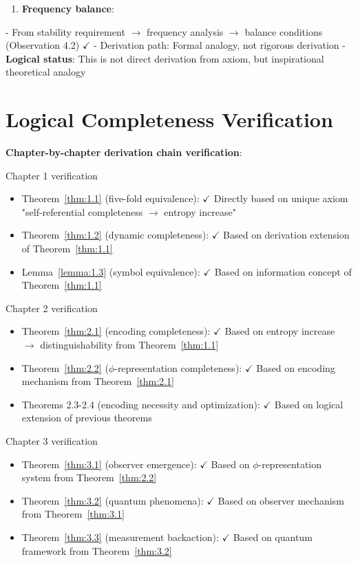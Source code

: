 \begin{enumerate}
\item \textbf{Frequency balance}:
\end{enumerate}
   - From stability requirement $\rightarrow$ frequency analysis $\rightarrow$ balance conditions (Observation 4.2) $\checkmark$
   - Derivation path: Formal analogy, not rigorous derivation
   - \textbf{Logical status}: This is not direct derivation from axiom, but inspirational theoretical analogy

\section{Logical Completeness Verification}
\label{sec:ch08_completeness:logical-completeness-verification}

\textbf{Chapter-by-chapter derivation chain verification}:

Chapter 1 verification
\begin{itemize}
\item Theorem~\ref{thm:1.1} (five-fold equivalence): $\checkmark$ Directly based on unique axiom "self-referential completeness $\rightarrow$ entropy increase"
\item Theorem~\ref{thm:1.2} (dynamic completeness): $\checkmark$ Based on derivation extension of Theorem~\ref{thm:1.1}
\item Lemma~\ref{lemma:1.3} (symbol equivalence): $\checkmark$ Based on information concept of Theorem~\ref{thm:1.1}
\end{itemize}

Chapter 2 verification
\begin{itemize}
\item Theorem~\ref{thm:2.1} (encoding completeness): $\checkmark$ Based on entropy increase $\rightarrow$ distinguishability from Theorem~\ref{thm:1.1}
\item Theorem~\ref{thm:2.2} ($\phi$-representation completeness): $\checkmark$ Based on encoding mechanism from Theorem~\ref{thm:2.1}
\item Theorems 2.3-2.4 (encoding necessity and optimization): $\checkmark$ Based on logical extension of previous theorems
\end{itemize}

Chapter 3 verification
\begin{itemize}
\item Theorem~\ref{thm:3.1} (observer emergence): $\checkmark$ Based on $\phi$-representation system from Theorem~\ref{thm:2.2}
\item Theorem~\ref{thm:3.2} (quantum phenomena): $\checkmark$ Based on observer mechanism from Theorem~\ref{thm:3.1}
\item Theorem~\ref{thm:3.3} (measurement backaction): $\checkmark$ Based on quantum framework from Theorem~\ref{thm:3.2}
\end{itemize}

